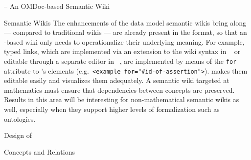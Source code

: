 \begin{omgroup}[id=swim,creators={clange,miko}]{{\swim} -- An OMDoc-based Semantic Wiki}
\begin{omgroup}{Semantic Wikis}
The enhancements of the data model semantic wikis bring along --- compared to traditional
wikis --- are already present in the {\omdoc} format, so that an {\omdoc}-based wiki only
needs to operationalize their underlying meaning. For example, typed links, which are
implemented via an extension to the wiki syntax in ~\cite{voelkel06:semanticwikipedia} or editable through a separate editor in
~\cite{schaffert06:ikewiki}, are implemented by means of the \texttt{for}
attribute to {\omdoc}'s elements (e.g.\ \texttt{<example for="\#id-of-assertion">}).
{\swim} makes them editable easily and visualizes them adequately.  A semantic wiki
targeted at mathematics must ensure that dependencies between concepts are preserved.
Results in this area will be interesting for non-mathematical semantic wikis as well,
especially when they support higher levels of formalization such as ontologies.
\end{omgroup}

\begin{omgroup}{Design of {\swim}}

\begin{omgroup}{Concepts and Relations}


\end{omgroup}
\end{omgroup}
\end{omgroup}
